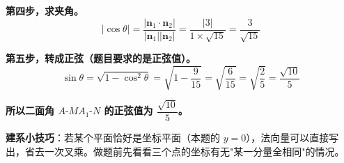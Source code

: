 \begin{answer}
\textbf{第四步，求夹角。}
\nopagebreak[4]
\[\left|\cos\theta\right|=\frac{\left|\boldsymbol n_1\cdot\boldsymbol n_2\right|}{\left|\boldsymbol n_1\right|\left|\boldsymbol n_2\right|}=\frac{|3|}{1\times\sqrt{15}}=\frac3{\sqrt{15}}\]

\textbf{第五步，转成正弦（题目要求的是正弦值）。}
\nopagebreak[4]
\[\sin\theta=\sqrt{1-\cos^{2}\theta}=\sqrt{1-\frac9{15}}=\sqrt{\frac6{15}}=\sqrt{\frac25}=\frac{\sqrt{10}}5\]

\textbf{所以二面角 $A\text{-}MA_1\text{-}N$ 的正弦值为 $\dfrac{\sqrt{10}}5$。}

\begin{gktip}
\textbf{建系小技巧}：若某个平面恰好是坐标平面（本题的 $y=0$），法向量可以直接写出，省去一次叉乘。做题前先看看三个点的坐标有无"某一分量全相同"的情况。
\end{gktip}



\par\medskip

\end{answer}
